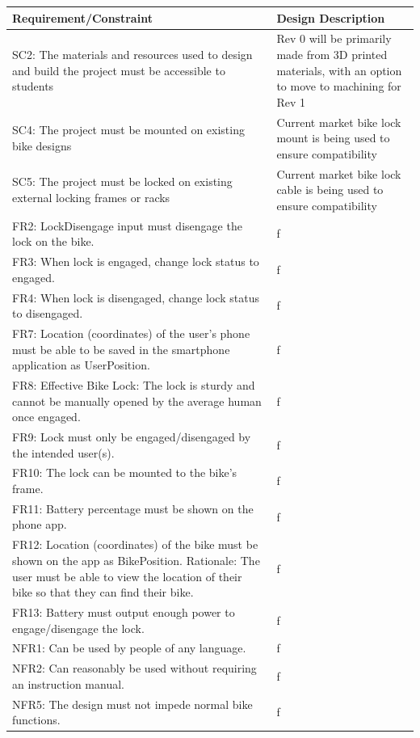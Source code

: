 \documentclass[12pt, titlepage]{article}
\begin{document}
\begin{minipage}{\textwidth}
\renewcommand*{\arraystretch}{1.5}
\begin{tabular}{| p{} | p{} | }
 \hline
 Requirement/Constraint & Design Description\\ 
 \hline
 SC2:  The materials and resources used to design and build the project must be accessible to students& Rev 0 will be primarily made from 3D printed materials, with an option to move to machining for Rev 1\\
 \hline
 SC4:  The project must be mounted on existing bike designs & Current market bike lock mount is being used to ensure compatibility\\
 \hline
 SC5:  The project must be locked on existing external locking frames or racks &Current market bike lock cable is being used to ensure compatibility\\
 \hline
FR2: LockDisengage input must disengage the lock on the bike.&f\\
 \hline
FR3: When lock is engaged, change lock status to engaged.&f\\
 \hline
FR4: When lock is disengaged, change lock status to disengaged.&f\\
 \hline
FR7: Location (coordinates) of the user’s phone must be able to be saved in the smartphone application as UserPosition. &f\\
 \hline
FR8: Effective Bike Lock: The lock is sturdy and cannot be manually opened by the average human once engaged. &f\\
 \hline
FR9: Lock must only be engaged/disengaged by the intended user(s).&f\\
 \hline
FR10: The lock can be mounted to the bike’s frame. &f\\
 \hline
FR11: Battery percentage must be shown on the phone app.&f\\
 \hline
FR12: Location (coordinates) of the bike must be shown on the app as BikePosition. Rationale: The user must be able to view the location of their bike so that they can find their bike. &f\\
 \hline
FR13: Battery must output enough power to engage/disengage the lock. &f\\
 \hline
NFR1: Can be used by people of any language.&f\\
 \hline
NFR2: Can reasonably be used without requiring an instruction manual.&f\\
 \hline
NFR5: The design must not impede normal bike functions.&f\\

\end{tabular}
\end{minipage}
\end{document}

